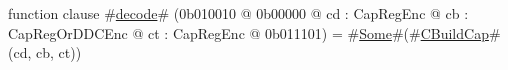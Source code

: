 function clause #\hyperref[sailMIPSzdecode]{decode}# (0b010010 @ 0b00000 @ cd : CapRegEnc @ cb : CapRegOrDDCEnc @ ct : CapRegEnc @ 0b011101) = #\hyperref[sailMIPSzSome]{Some}#(#\hyperref[sailMIPSzCBuildCap]{CBuildCap}#(cd, cb, ct))
